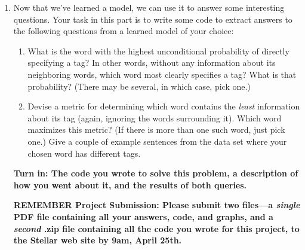 \begin{enumerate}
\item Now that we've learned a model, we can use it to answer some interesting
questions. Your task in this part is to write some code to extract answers
to the following questions from a learned model of your choice:
\begin{enumerate}
 \item What is the word with the highest unconditional probability of directly 
  specifying a tag? In other words, without any information about its neighboring words,
  which word most clearly specifies a tag? What is that probability? (There may be several, in which case, pick one.) 
   \item Devise a metric for determining which word contains the \textit{least} information
   about its tag (again, ignoring the words surrounding it). Which word maximizes this metric?
   (If there is more than one such word, just pick one.) Give a couple of example sentences
   from the data set where your chosen word has different tags. 
\end{enumerate}
\textbf{Turn in: The code you wrote to solve this problem, a description of how you
went about it, and the results of both queries.}


{\bf REMEMBER Project Submission: Please submit two files---a \emph{single} PDF file containing all your answers, code, and graphs, and a
\emph{second} .zip file containing all the code you wrote for this
project, to
the Stellar web site by 9am, April 25th.}

\end{enumerate} 
